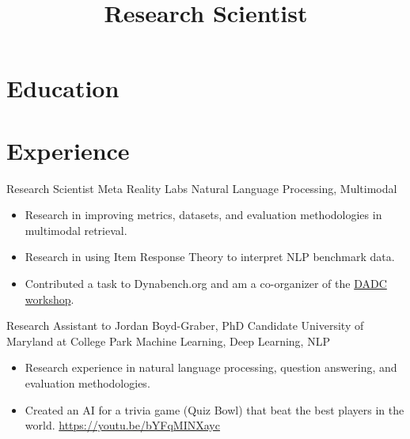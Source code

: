 \documentclass[11pt,a4paper,sans]{moderncv} %
\title{Research Scientist}
\begin{document}
\makecvtitle %
\vspace{-6ex}

\section{Education}





\section{Experience}
		{Research Scientist}
		{Meta Reality Labs}
		{Natural Language Processing, Multimodal}
		{}
		{
			\begin{itemize}
				\item Research in improving metrics, datasets, and evaluation methodologies in multimodal retrieval.
				\item Research in using Item Response Theory to interpret NLP benchmark data.
				\item Contributed a task to Dynabench.org and am a co-organizer of the \href{https://dadcworkshop.github.io/}{DADC workshop}.
			\end{itemize}
		}

		{Research Assistant to Jordan Boyd-Graber, PhD Candidate}
		{University of Maryland at College Park}
		{Machine Learning, Deep Learning, NLP}
		{}
		{
			\begin{itemize}
			\item Research experience in natural language processing, question answering, and evaluation methodologies.
      \item Created an AI for a trivia game (Quiz Bowl) that beat the best players in the world. \url{https://youtu.be/bYFqMINXayc}
			\end{itemize}
		}
\end{document}
